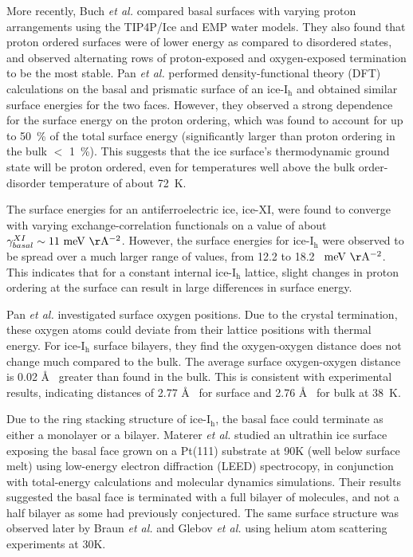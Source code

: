More recently, Buch \textit{et al.} compared basal surfaces with
varying proton arrangements using the TIP4P/Ice and EMP water
models.\cite{Buch2008} They also found that proton ordered surfaces
were of lower energy as compared to disordered states, and observed
alternating rows of proton-exposed and oxygen-exposed termination to
be the most stable.  Pan \textit{et al.} performed density-functional
theory (DFT) calculations on the basal and prismatic surface of an
ice-I$_\mathrm{h}$ and obtained similar surface energies for the two
faces.\cite{Pan2010} However, they observed a strong dependence for
the surface energy on the proton ordering, which was found to account
for up to 50~\% of the total surface energy (significantly larger than
proton ordering in the bulk $<$ 1~\%). This suggests that the ice
surface's thermodynamic ground state will be proton ordered, even for
temperatures well above the bulk order-disorder temperature of about
72~K.

The surface energies for an antiferroelectric ice, ice-XI, were found
to converge with varying exchange-correlation functionals on a value
of about $\gamma_{basal}^{XI} \sim 11~\mathrm{meV~\AA^{-2}}$. However,
the surface energies for ice-I$_\mathrm{h}$ were observed to be spread
over a much larger range of values, from 12.2 to 18.2~
$\mathrm{meV~\AA^{-2}}$. This indicates that for a constant internal
ice-I$_\mathrm{h}$ lattice, slight changes in proton ordering at the
surface can result in large differences in surface energy.

Pan \textit{et al.} investigated surface oxygen
positions. \cite{Pan2010} Due to the crystal termination, these oxygen
atoms could deviate from their lattice positions with thermal
energy. For ice-I$_\mathrm{h}$ surface bilayers, they find the
oxygen-oxygen distance does not change much compared to the bulk. The
average surface oxygen-oxygen distance is 0.02 \AA~ greater than found
in the bulk. This is consistent with experimental results, indicating
distances of 2.77 \AA~ for surface and 2.76 \AA~ for bulk at
38~K.\cite{Parent2002}

Due to the ring stacking structure of ice-I$_\mathrm{h}$, the basal
face could terminate as either a monolayer or a bilayer. Materer
\textit{et al.} studied an ultrathin ice surface exposing the basal
face grown on a Pt(111) substrate at 90K (well below surface melt)
using low-energy electron diffraction (LEED) spectrocopy, in
conjunction with total-energy calculations and molecular dynamics
simulations.\cite{Materer1995,Materer1997} Their results suggested the
basal face is terminated with a full bilayer of molecules, and not a
half bilayer as some had previously conjectured. The same surface
structure was observed later by Braun \textit{et al.}\cite{Braun1998}
and Glebov \textit{et al.}\cite{Glebov2000} using helium atom
scattering experiments at 30K.

